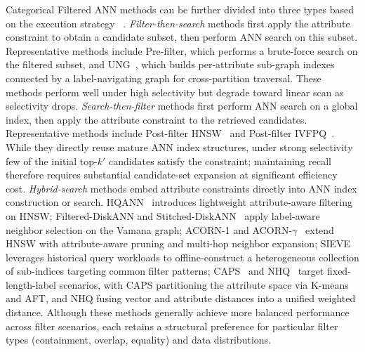 Categorical Filtered ANN methods can be further divided into three types based on the execution strategy ~\cite{FilteredANNBenchmark2024}.
\textit{Filter-then-search} methods first apply the attribute constraint to obtain a candidate subset, then perform ANN search on this subset. Representative methods include Pre-filter, which performs a brute-force search on the filtered subset, and UNG~\cite{UNG2024}, which builds per-attribute sub-graph indexes connected by a label-navigating graph for cross-partition traversal. These methods perform well under high selectivity but degrade toward linear scan as selectivity drops.
\textit{Search-then-filter} methods first perform ANN search on a global index, then apply the attribute constraint to the retrieved candidates. Representative methods include Post-filter HNSW~\cite{HNSW2018} and Post-filter IVFPQ~\cite{FaissGPUIVFPQ2019}. While they directly reuse mature ANN index structures, under strong selectivity few of the initial top-$k'$ candidates satisfy the constraint; maintaining recall therefore requires substantial candidate-set expansion at significant efficiency cost.
\textit{Hybrid-search} methods embed attribute constraints directly into ANN index construction or search. HQANN~\cite{HQANN2022} introduces lightweight attribute-aware filtering on HNSW; Filtered-DiskANN and Stitched-DiskANN~\cite{FilteredStitchedVamana2023} apply label-aware neighbor selection on the Vamana graph; ACORN-1 and ACORN-$\gamma$~\cite{ACORN2024} extend HNSW with attribute-aware pruning and multi-hop neighbor expansion; SIEVE~\cite{SIEVE2025} leverages historical query workloads to offline-construct a heterogeneous collection of sub-indices targeting common filter patterns; CAPS~\cite{CAPS2023} and NHQ~\cite{NHQNPG2023} target fixed-length-label scenarios, with CAPS partitioning the attribute space via K-means and AFT, and NHQ fusing vector and attribute distances into a unified weighted distance. Although these methods generally achieve more balanced performance across filter scenarios, each retains a structural preference for particular filter types (containment, overlap, equality) and data distributions.

